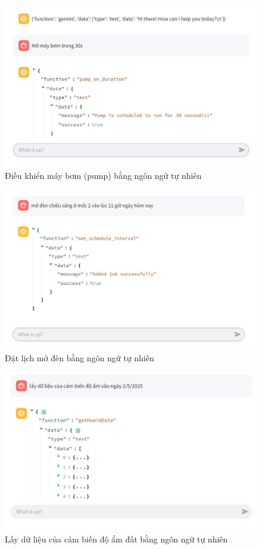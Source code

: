 \begin{figure}[H]
    \centering
    \includegraphics[width=1\linewidth]{content/images/AI_Chatbox_2.jpg}
    \caption{Điều khiển máy bơm (pump) bằng ngôn ngữ tự nhiên}
\end{figure}

\begin{figure}[H]
    \centering
    \includegraphics[width=1\linewidth]{content/images/AI_Chatbox_3.jpg}
    \caption{Đặt lịch mở đèn bằng ngôn ngữ tự nhiên}
\end{figure}

\begin{figure}[H]
    \centering
    \includegraphics[width=1\linewidth]{content/images/AI_Chatbox_4.jpg}
    \caption{Lấy dữ liệu của cảm biến độ ẩm đất bằng ngôn ngữ tự nhiên}
\end{figure}

\newpage

